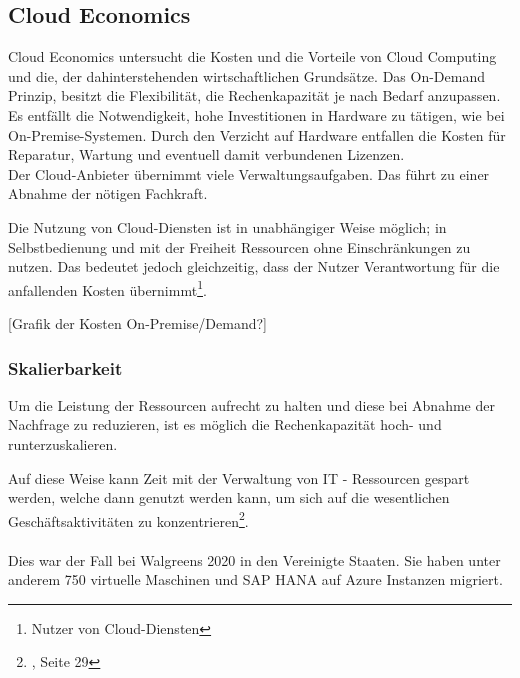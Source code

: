 \subsection{Cloud Economics}\label{subsec_UabsGrund3}
\begin{flushleft}
      Cloud Economics untersucht die Kosten und die Vorteile von Cloud
      Computing und die, der dahinterstehenden wirtschaftlichen Grundsätze.
      Das On-Demand Prinzip, besitzt die Flexibilität, die Rechenkapazität je nach Bedarf anzupassen.
      Es entfällt die Notwendigkeit, hohe Investitionen in Hardware zu tätigen, wie bei On-Premise-Systemen.
      Durch den Verzicht auf Hardware entfallen die Kosten für Reparatur, Wartung und eventuell damit verbundenen Lizenzen.
      \\
      Der Cloud-Anbieter übernimmt viele Verwaltungsaufgaben. Das führt zu einer Abnahme der nötigen Fachkraft.
            {\cite{IDC01}}

      Die Nutzung von Cloud-Diensten ist in unabhängiger Weise möglich;
      in Selbstbedienung und mit der Freiheit Ressourcen ohne Einschränkungen zu nutzen. Das bedeutet jedoch gleichzeitig, dass der Nutzer Verantwortung für die anfallenden Kosten übernimmt\footnote{Nutzer von Cloud-Diensten}.
\end{flushleft}

[Grafik der Kosten On-Premise/Demand?]
\subsubsection{Skalierbarkeit}
Um die Leistung der Ressourcen aufrecht zu halten und diese bei Abnahme der Nachfrage zu reduzieren,  ist es möglich die Rechenkapazität hoch- und runterzuskalieren.

Auf diese Weise kann Zeit mit der Verwaltung von IT - Ressourcen gespart werden, welche dann genutzt werden kann, um sich auf die wesentlichen Geschäftsaktivitäten zu konzentrieren\footnote{{\cite{AWS1}}, Seite 29}.
\\\\
Dies war der Fall bei Walgreens 2020 in den Vereinigte Staaten.
Sie haben unter anderem 750 virtuelle Maschinen und SAP HANA auf Azure Instanzen migriert.

